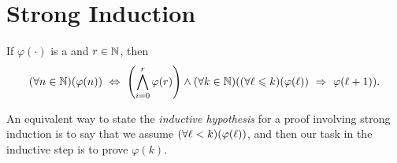 \section{Strong Induction}
\begin{theorem}\label{thm:stronginduction}
    If $\varphi(\cdot)$ is a {\wff} and $r \in \mathbb{N}$, then
    \[
        \pn*{\forall n \in \N}\pn*{\varphi(n)}
        \iff \pn*{\bigmeet_{i = 0}^{r}\varphi(r)}
        \meet \pn*{\forall k \in \N}\pn*{\pn*{\forall \ell \leq k}\pn*{\varphi(\ell)} \implies \varphi(\ell + 1)}.
    \]
\end{theorem}
\begin{note}
    An equivalent way to state the \emph{inductive hypothesis} for a proof involving strong induction
    is to say that we assume $\pn*{\forall \ell < k}\pn*{\varphi(\ell)}$,
    and then our task in the inductive step is to prove $\varphi(k)$.
\end{note}

